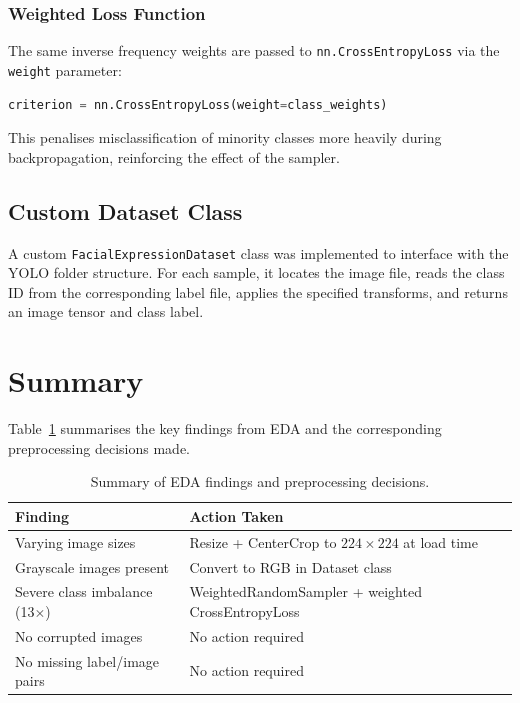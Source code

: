 \documentclass[12pt, a4paper]{article}
\begin{document}
\subsubsection{Weighted Loss Function}

The same inverse frequency weights are passed to \texttt{nn.CrossEntropyLoss} via the \texttt{weight} parameter:

\begin{lstlisting}[language=Python]
criterion = nn.CrossEntropyLoss(weight=class_weights)
\end{lstlisting}

This penalises misclassification of minority classes more heavily during backpropagation, reinforcing the effect of the sampler.

\subsection{Custom Dataset Class}

A custom \texttt{FacialExpressionDataset} class was implemented to interface with the YOLO folder structure. For each sample, it locates the image file, reads the class ID from the corresponding label file, applies the specified transforms, and returns an image tensor and class label.

\section{Summary}

Table~\ref{tab:summary} summarises the key findings from EDA and the corresponding preprocessing decisions made.

\begin{table}[H]
\centering
\begin{tabular}{p{5cm}p{8cm}}
\toprule
\textbf{Finding} & \textbf{Action Taken} \\
\midrule
Varying image sizes & Resize + CenterCrop to $224 \times 224$ at load time \\
Grayscale images present & Convert to RGB in Dataset class \\
Severe class imbalance (13$\times$) & WeightedRandomSampler + weighted CrossEntropyLoss \\
No corrupted images & No action required \\
No missing label/image pairs & No action required \\
\bottomrule
\end{tabular}
\caption{Summary of EDA findings and preprocessing decisions.}
\label{tab:summary}
\end{table}
\end{document}
